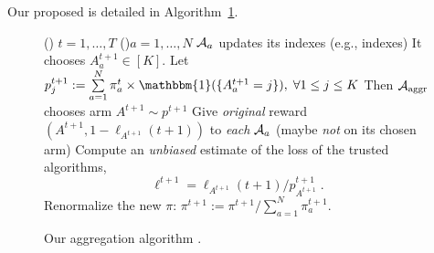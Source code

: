 Our proposed \Aggr{} is detailed in Algorithm~\ref{algo:25:Aggr}.
%
\begin{small}
	\begin{figure}[h!]
		\centering
		\begin{framed}
		\begin{algorithm}[H]
			\For()
            {$t = 1, \dots, T$}{
				\For(){$a = 1, \dots, N$}{
					$\Alg_a$ updates its indexes (e.g., \UCB{} indexes)\;
					It chooses $A^{t+1}_{a} \in [K]$.
				}
				Let $p^{t+1}_j := \sum\limits_{a = 1}^{N} \pi^{t}_a \times \mathbbm{1}(\{A^{t+1}_{a} = j\}), \;\forall 1\leq j \leq K$\;
				Then $\mathcal{A}_{\mathrm{aggr}}$ chooses arm $A^{t+1} \sim p^{t+1}$\;
				Give \emph{original} reward $(A^{t+1}, 1 - \ell_{A^{t+1}}(t+1))$ to \emph{each} $\Alg_a$ (maybe \emph{not} on its chosen arm)\;
				Compute an \emph{unbiased} estimate of the loss of the trusted algorithms,$$ \ell^{t+1} = \ell_{A^{t+1}}(t+1) / p^{t+1}_{A^{t+1}}\;. $$
				\For{$a = 1, \dots, N$}{
					\If{$\Alg_a$ was trusted, \ie, $A^{t+1}_{a} = A^{t+1}$}{
						$ \pi^{t+1}_{a} = \exp(\eta_t \ell^{t+1}) \times \pi^{t}_{a} $
						}%
				}
				Renormalize the new $\pi$: $\pi^{t+1} := \pi^{t+1} / \sum_{a=1}^{N} \pi^{t+1}_{a}$.
			}
			\caption{Our aggregation algorithm \Aggr.}
			\label{algo:25:Aggr}
		\end{algorithm}
		\end{framed}
	\end{figure}
\end{small}


